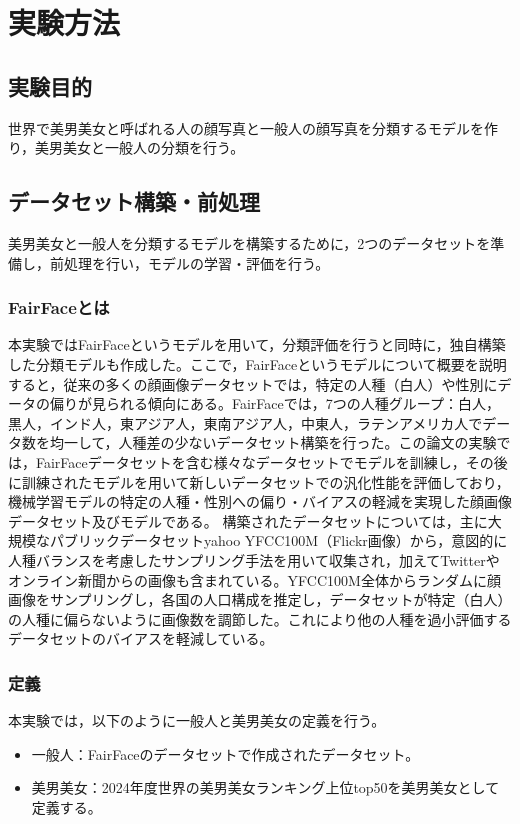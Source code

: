 \documentclass[a4paper,11pt,titlepage]{jsarticle}
\begin{document}
\section{実験方法}
\label{label:実験方法}
\subsection{実験目的}
世界で美男美女と呼ばれる人の顔写真と一般人の顔写真を分類するモデルを作り，美男美女と一般人の分類を行う。

\subsection{データセット構築・前処理}
美男美女と一般人を分類するモデルを構築するために，2つのデータセットを準備し，前処理を行い，モデルの学習・評価を行う。

\subsubsection{FairFaceとは}
本実験ではFairFaceというモデルを用いて，分類評価を行うと同時に，独自構築した分類モデルも作成した。ここで，FairFaceというモデルについて概要を説明すると，従来の多くの顔画像データセットでは，特定の人種（白人）や性別にデータの偏りが見られる傾向にある。FairFaceでは，7つの人種グループ：白人，黒人，インド人，東アジア人，東南アジア人，中東人，ラテンアメリカ人でデータ数を均一して，人種差の少ないデータセット構築を行った。この論文の実験では，FairFaceデータセットを含む様々なデータセットでモデルを訓練し，その後に訓練されたモデルを用いて新しいデータセットでの汎化性能を評価しており，機械学習モデルの特定の人種・性別への偏り・バイアスの軽減を実現した顔画像データセット及びモデルである。
構築されたデータセットについては，主に大規模なパブリックデータセットyahoo YFCC100M（Flickr画像）から，意図的に人種バランスを考慮したサンプリング手法を用いて収集され，加えてTwitterやオンライン新聞からの画像も含まれている。YFCC100M全体からランダムに顔画像をサンプリングし，各国の人口構成を推定し，データセットが特定（白人）の人種に偏らないように画像数を調節した。これにより他の人種を過小評価するデータセットのバイアスを軽減している。




\subsubsection{定義}
本実験では，以下のように一般人と美男美女の定義を行う。
\begin{itemize}
    \item 一般人：FairFaceのデータセットで作成されたデータセット。
    \item 美男美女：2024年度世界の美男美女ランキング上位top50を美男美女として定義する。
\end{itemize}
\end{document}
